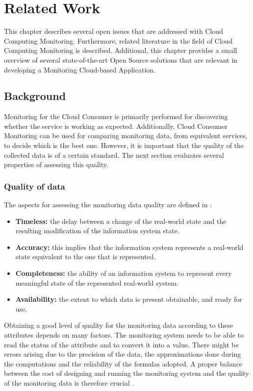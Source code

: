\chapter{Related Work}\label{ch:related_work}
This chapter describes several open issues that are addressed with Cloud Computing Monitoring. Furthermore, related literature in the field of Cloud Computing Monitoring is described. Additional, this chapter provides a small overview of several state-of-the-art Open Source solutions that are relevant in developing a Monitoring Cloud-based Application.

\section{Background} \label{sec:background}
Monitoring for the Cloud Consumer is primarily performed for discovering whether the service is working as expected. Additionally, Cloud Consumer Monitoring can be used for comparing monitoring data, from equivalent services, to decide which is the best one. However, it is important that the quality of the collected data is of a certain standard. The next section evaluates several properties of assessing this quality.

\subsection{Quality of data} \label{sec:quality}
The aspects for assessing the monitoring data quality are defined in \cite{wand1996anchoring}:
\begin{itemize}
    \item \textbf{Timeless: }the delay between a change of the real-world state and the resulting modification of the information system state.
    \item \textbf{Accuracy: }this implies that the information system represents a real-world state equivalent to the one that is represented.
    \item \textbf{Completeness: }the ability of an information system to represent every meaningful state of the represented real-world system.
    \item \textbf{Availability: }the extent to which data is present obtainable, and ready for use.
\end{itemize}

\noindent
Obtaining a good level of quality for the monitoring data according to these attributes depends on many factors. The monitoring system needs to be able to read the status of the attribute and to convert it into a value. There might be errors arising due to the precision of the data, the approximations done during the computations and the reliability of the formulas adopted. A proper balance between the cost of designing and running the monitoring system and the quality of the monitoring data is therefore crucial \cite{pernici2016monitoring}. 



